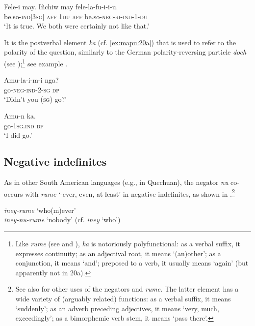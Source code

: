 \documentclass[output=paper,colorlinks,citecolor=brown,draft]{langscibook}
\begin{document}
    \ex\label{ex:mapu:20b}
        \gll Fele-i may. Iñchiw  may  fele-la-fu-i-i-u. \\
             be.so-\textsc{ind[3sg]} \textsc{aff} \textsc{1du} \textsc{aff} be.so\nobreakdash-\textsc{neg-ri-ind-1-du}\\
        \glt ‘It is true. We both were certainly not like that.’
    \z
\z 

It is the postverbal element \textit{ka} (cf. \ref{ex:mapu:20a}) that is used to refer to the polarity of the question, similarly to the German polarity-reversing particle \textit{doch} (see \citealt{Moser2019});\footnote{Like \textit{rume} (see  and ), \textit{ka} is notoriously polyfunctional: as a verbal suffix, it expresses continuity; as an adjectival root, it means ‘(an)other’; as a conjunction, it means ‘and’; preposed to a verb, it usually means ‘again’ (but apparently not in 20a).} see example  \citep[based on][71]{Augusta1916}. 

\ea\label{ex:mapu:21} 
    \begin{xlist}
    \label{ex:mapu:21a}
        \gll Amu-la-i-m-i    nga? \\ 
             go-\textsc{neg-ind-2-sg}  \textsc{dp} \\
        \glt ‘Didn’t you (\textsc{sg}) go?’
    
    \label{ex:mapu:21b}
        \gll Amu-n      ka. \\
             go-\textsc{1sg.ind}     \textsc{dp} \\
        \glt ‘I did go.’
    \end{xlist}
\z 

\subsection{Negative indefinites}
\label{sec:mapu:3.2}

As in other South American languages (e.g., in Quechuan), the negator \textit{nu} co-occurs with \textit{rume} ‘-ever, even, at least’ in negative indefinites, as shown in .\footnote{See also  for other uses of the negators and \textit{rume}. The latter element has a wide variety of (arguably related) functions: as a verbal suffix, it means ‘suddenly’; as an adverb preceding adjectives, it means ‘very, much, exceedingly’; as a bimorphemic verb stem, it means ‘pass there’.} 

\ea\label{ex:mapu:22}
    \ea\label{ex:mapu:22a}
        \gll \textit{iney-rume}   ‘who(m)ever’\\ 
             \textit{iney-nu-rume} ‘nobody’  (cf. \textit{iney} ‘who’)\\
\end{document}
